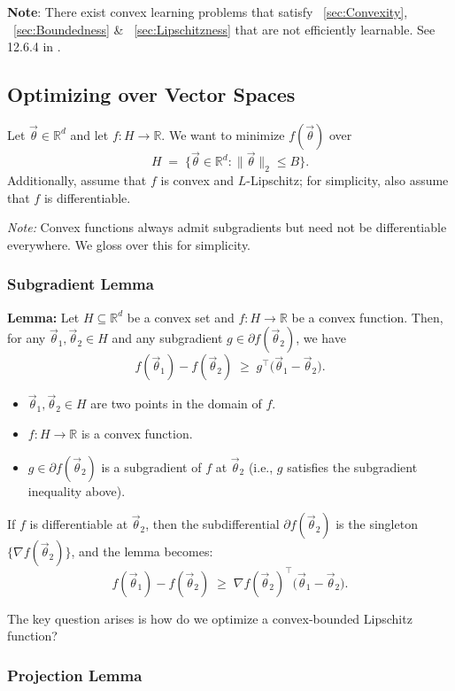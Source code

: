 \documentclass[11pt]{article}
\theoremstyle{plain}
\begin{document}
\noindent \textbf{Note}: There exist convex learning problems that satisfy
~\ref{sec:Convexity}, ~\ref{sec:Boundedness} \& ~\ref{sec:Lipschitzness} that
are not efficiently learnable. See 12.6.4 in \cite{ShalevShwartzUnderstandingML}.

\subsection{Optimizing over Vector Spaces}
Let $\vec{\theta}\in\mathbb{R}^d$ and let $f:H\to\mathbb{R}$. We want to minimize $f(\vec{\theta})$ over
\[
  H \;=\; \bigl\{\vec{\theta}\in\mathbb{R}^d : \lVert \vec{\theta}\rVert_2 \le B \bigr\}.
\]
Additionally, assume that $f$ is convex and $L$-Lipschitz; for simplicity, also assume that $f$ is differentiable.

\smallskip
\noindent\textit{Note:} Convex functions always admit subgradients but need not be differentiable everywhere. We gloss over this for simplicity.


\subsubsection{Subgradient Lemma}
\textbf{Lemma:}  
Let $H \subseteq \mathbb{R}^d$ be a convex set and $f : H \to \mathbb{R}$ be a convex function.  
Then, for any $\vec{\theta}_1, \vec{\theta}_2 \in H$ and any subgradient $g \in \partial f(\vec{\theta}_2)$, we have
\[
    f(\vec{\theta}_1) - f(\vec{\theta}_2) \;\ge\; g^\top \big(\vec{\theta}_1 - \vec{\theta}_2\big).
\]
\begin{itemize}
    \item $\vec{\theta}_1, \vec{\theta}_2 \in H$ are two points in the domain of $f$.
    \item $f : H \to \mathbb{R}$ is a convex function.
    \item $g \in \partial f(\vec{\theta}_2)$ is a subgradient of $f$ at $\vec{\theta}_2$ (i.e., $g$ satisfies the subgradient inequality above).
\end{itemize}

If $f$ is differentiable at $\vec{\theta}_2$, then the subdifferential $\partial f(\vec{\theta}_2)$ is the singleton $\{\nabla f(\vec{\theta}_2)\}$, and the lemma becomes:
\[
    f(\vec{\theta}_1) - f(\vec{\theta}_2) \;\ge\; \nabla f(\vec{\theta}_2)^\top \big(\vec{\theta}_1 - \vec{\theta}_2\big).
\]


The key question arises is how do we optimize a convex-bounded Lipschitz function?

\subsubsection{Projection Lemma}
\end{document}
